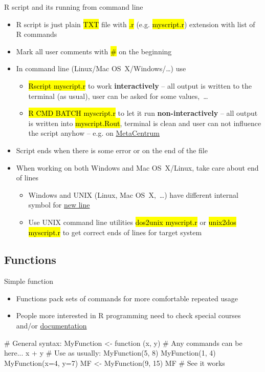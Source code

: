 \documentclass[compress, ucs, xelatex, 11pt, xcolor=svgnames,
  hyperref={
    bookmarks=true,
    unicode=true,
    colorlinks=true,
    pdftitle={Molecular data in R},
    plainpages=false,
    pdfauthor={Vojtech Zeisek},
    pdfsubject={Course about phylogeny and evolution in R},
    pdfcreator={XeLaTeX},
    pdfkeywords={R, evolution, phylogeny, molecular data},
    linkcolor=Tomato,
    anchorcolor=SaddleBrown,
    citecolor=Goldenrod,
    filecolor=DarkMagenta,
    menucolor=Sienna,
    urlcolor=DarkTurquoise,
    pdftex},
  url={hyphens, lowtilde} %
  ]{beamer}
\renewcommand{\texttt}[1]{\hl{\ttfamily #1}}
\begin{document}
\begin{frame}{R script and its running from command line}
  \begin{itemize}
    \item R script is just plain \texttt{TXT} file with \texttt{.r} (e.g. \texttt{myscript.r}) extension with list of R commands
    \item Mark all user comments with \texttt{\#} on the beginning
    \item In command line (Linux/Mac OS~X/Windows/\ldots) use
    \begin{itemize}
      \item \texttt{Rscript myscript.r} to work \textbf{interactively} -- all output is written to the terminal (as usual), user can be asked for some values,~\ldots
      \item \texttt{R CMD BATCH myscript.r} to let it run \textbf{non-interactively} -- all output is written into \texttt{myscript.Rout}, terminal is clean and user can not influence the script anyhow -- e.g. on \href{https://www.metacentrum.cz/en/}{MetaCentrum}
    \end{itemize}
    \item Script ends when there is some error or on the end of the file
    \item When working on both Windows and Mac OS~X/Linux, take care about end of lines
    \begin{itemize}
      \item Windows and UNIX (Linux, Mac OS~X,~\ldots) have different internal symbol for \href{https://en.wikipedia.org/wiki/Newline}{new line}
      \item Use UNIX command line utilities \texttt{dos2unix myscript.r} or \texttt{unix2dos myscript.r} to get correct ends of lines for target system
    \end{itemize}
  \end{itemize}
\end{frame}

\subsection{Functions}

\begin{frame}[fragile]{Simple function}
  \begin{itemize}
    \item Functions pack sets of commands for more comfortable repeated usage
    \item People more interested in R programming need to check special courses and/or \href{https://cran.r-project.org/manuals.html}{documentation}
  \end{itemize}
  \begin{spluscode}
    # General syntax:
    MyFunction <- function (x, y) {
      # Any commands can be here...
      x + y
      }
    # Use as usually:
    MyFunction(5, 8)
    MyFunction(1, 4)
    MyFunction(x=4, y=7)
    MF <- MyFunction(9, 15)
    MF # See it works
  \end{spluscode}
\end{frame}
\end{document}
